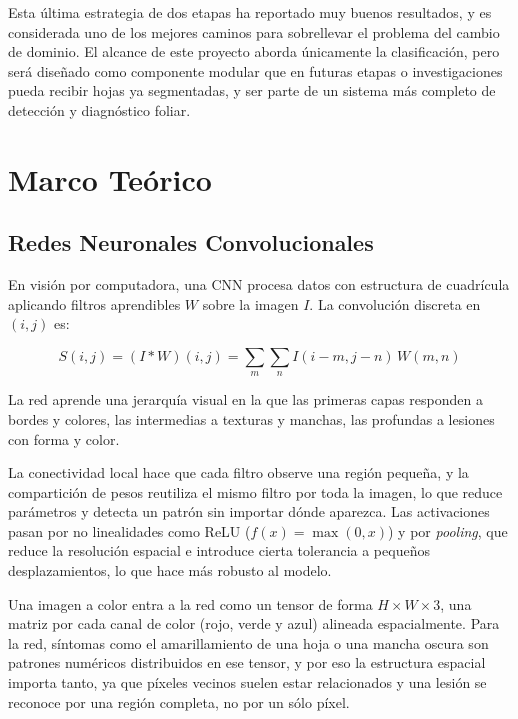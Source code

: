 \documentclass[12pt,letterpaper]{article}
\begin{document}
Esta última estrategia de dos etapas ha reportado muy buenos resultados, y es considerada uno de los mejores caminos para sobrellevar el problema del cambio de dominio. El alcance de este proyecto aborda únicamente la clasificaci\'on, pero será dise\~nado como componente modular que en futuras etapas o investigaciones pueda recibir hojas ya segmentadas, y ser parte de un sistema más completo de detecci\'on y diagn\'ostico foliar.

\section{Marco Te\'orico}

\subsection{Redes Neuronales Convolucionales}

En visión por computadora, una CNN procesa datos con estructura de cuadr\'icula aplicando filtros aprendibles $W$ sobre la imagen $I$. La convoluci\'on discreta en $(i,j)$ es:

\begin{equation}
S(i,j) = (I * W)(i,j) = \sum_{m}\sum_{n} I(i-m, j-n)\, W(m,n)
\end{equation}

La red aprende una jerarqu\'ia visual en la que las primeras capas responden a bordes y colores, las intermedias a texturas y manchas, las profundas a lesiones con forma y color.

La conectividad local hace que cada filtro observe una regi\'on peque\~na, y la compartici\'on de pesos reutiliza el mismo filtro por toda la imagen, lo que reduce par\'ametros y detecta un patr\'on sin importar d\'onde aparezca. Las activaciones pasan por no linealidades como ReLU ($f(x)=\max(0,x)$) y por \textit{pooling}, que reduce la resoluci\'on espacial e introduce cierta tolerancia a peque\~nos desplazamientos, lo que hace más robusto al modelo.

Una imagen a color entra a la red como un tensor de forma $H \times W \times 3$, una matriz por cada canal de color (rojo, verde y azul) alineada espacialmente. Para la red, s\'intomas como el amarillamiento de una hoja o una mancha oscura son patrones num\'ericos distribuidos en ese tensor, y por eso la estructura espacial importa tanto, ya que p\'ixeles vecinos suelen estar relacionados y una lesi\'on se reconoce por una regi\'on completa, no por un sólo p\'ixel.
\end{document}
